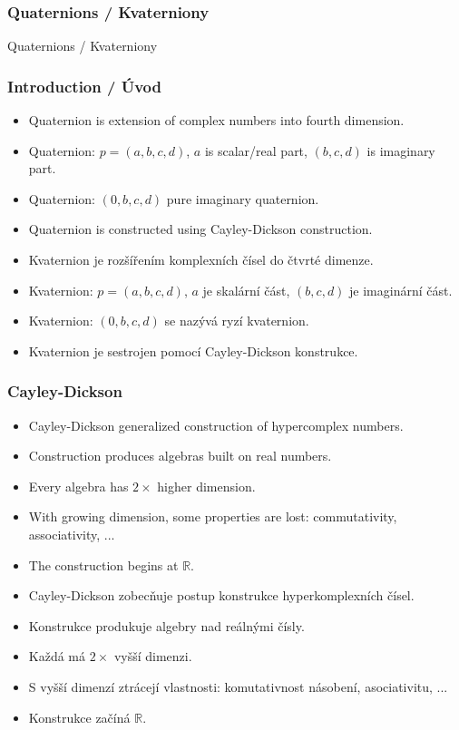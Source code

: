 \begin{frame}
\frametitle{Quaternions / Kvaterniony}
\begin{center}
\Huge {\color{white}Quaternions / Kvaterniony}
\end{center}
\end{frame}


\begin{frame}\frametitle{Introduction / Úvod}\scriptsize
	\begin{itemize}
	\item Quaternion is extension of complex numbers into fourth dimension.
	\item Quaternion: $p=(a,b,c,d)$, $a$ is scalar/real part, $(b,c,d)$ is imaginary part.
	\item Quaternion: $(0,b,c,d)$ pure imaginary quaternion.
	\item Quaternion is constructed using Cayley-Dickson construction.
	\end{itemize}
	\begin{itemize}
	\item Kvaternion je rozšířením komplexních čísel do čtvrté dimenze.
	\item Kvaternion: $p=(a,b,c,d)$, $a$ je skalární část, $(b,c,d)$ je imaginární část.
	\item Kvaternion: $(0,b,c,d)$ se nazývá ryzí kvaternion.
	\item Kvaternion je sestrojen pomocí Cayley-Dickson konstrukce.
	\end{itemize}
\end{frame}

\begin{frame}\frametitle{Cayley-Dickson}\scriptsize
	\begin{itemize}
	\item Cayley-Dickson generalized construction of hypercomplex numbers.
	\item Construction produces algebras built on real numbers.
	\item Every algebra has $2\times$ higher dimension.
	\item With growing dimension, some properties are lost: commutativity, associativity, ...
	\item The construction begins at $\mathbb{R}$.
	\end{itemize}
	\begin{itemize}
	\item Cayley-Dickson zobecňuje postup konstrukce hyperkomplexních čísel.
	\item Konstrukce produkuje algebry nad reálnými čísly.
	\item Každá má $2\times$ vyšší dimenzi.
	\item S vyšší dimenzí ztrácejí vlastnosti: komutativnost násobení, asociativitu, ...
	\item Konstrukce začíná $\mathbb{R}$.
	\end{itemize}
\end{frame}

